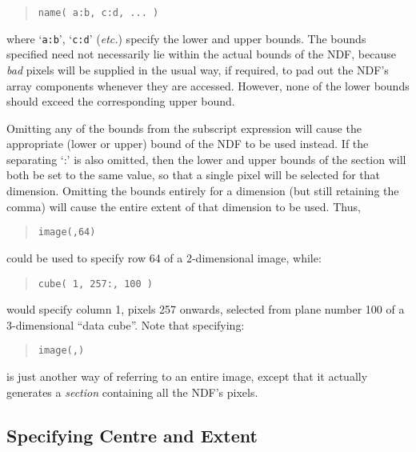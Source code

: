 \documentclass[twoside,11pt,nolof]{starlink}
\providecommand{\st}[1]{{\emph{#1}}}
\providecommand{\hi}[1]{{\texttt{#1}}}
\begin{document}
\small
\begin{quote}
\begin{center}
\hi{name( a:b, c:d, ... )}
\end{center}
\end{quote}
\normalsize

where `\hi{a:b}', `\hi{c:d}' (\st{etc.}) specify the lower and upper bounds.
The bounds specified need not necessarily lie within the actual bounds of the
NDF, because \st{bad\/} pixels will be supplied in the usual way, if required,
to pad out the NDF's array components whenever they are accessed. However, none
of the lower bounds should exceed the corresponding upper bound.

Omitting any of the bounds from the subscript expression will cause the
appropriate (lower or upper) bound of the NDF to be used instead. If the
separating `:' is also omitted, then the lower and upper bounds of the section
will both be set to the same value, so that a single pixel will be selected for
that dimension. Omitting the bounds entirely for a dimension (but still
retaining the comma) will cause the entire extent of that dimension to be used.
Thus,

\small
\begin{quote}
\begin{center}
\hi{image(,64)}
\end{center}
\end{quote}
\normalsize

could be used to specify row 64 of a 2-dimensional image, while:

\small
\begin{quote}
\begin{center}
\hi{cube( 1, 257:, 100 )}
\end{center}
\end{quote}
\normalsize

would specify column 1, pixels 257 onwards, selected from plane number
100 of a 3-dimensional ``data cube''.
Note that specifying:

\small
\begin{quote}
\begin{center}
\hi{image(,)}
\end{center}
\end{quote}
\normalsize

is just another way of referring to an entire image, except that it actually
generates a \st{section\/} containing all the NDF's pixels.

\subsection{Specifying Centre and Extent}
\end{document}
